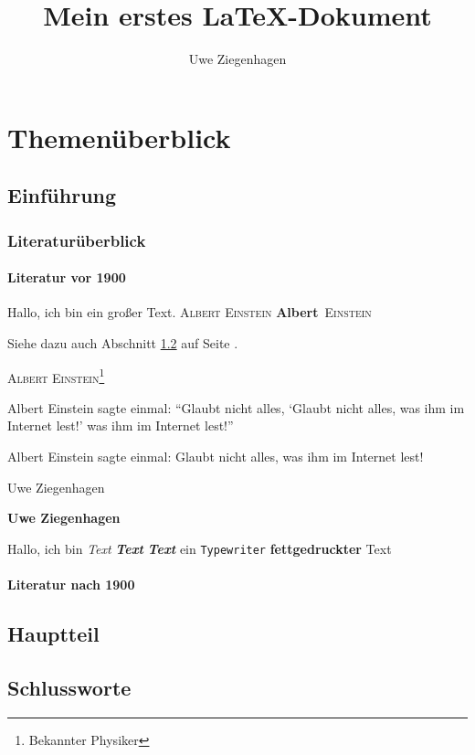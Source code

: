\documentclass[12pt,ngerman,parskip=half]{scrreprt}
\author{Uwe Ziegenhagen}
\title{Mein erstes \LaTeX-Dokument}
\newcommand{\person}[1]{\textsc{#1}}
\newcommand{\pperson}[2]{\textbf{#1}~\textsc{#2}}
\begin{document}
\maketitle

\tableofcontents

\chapter{Themenüberblick}

\section{Einführung}
\subsection{Literaturüberblick}
\subsubsection{Literatur vor 1900}

Hallo, ich {\tiny bin} ein {\Huge großer} Text. \person{Albert Einstein} \pperson{Albert}{Einstein} 

Siehe dazu auch Abschnitt \ref{sec:hauptteil} auf Seite \pageref{sec:hauptteil}.

\person{Albert Einstein}\footnote{Bekannter Physiker}

Albert Einstein sagte einmal: \enquote{Glaubt nicht alles, \enquote{Glaubt nicht alles, was ihm im Internet lest!} was ihm im Internet lest!}

Albert Einstein sagte einmal: \glqq Glaubt nicht alles, was ihm im Internet lest!\grqq


\textmd{Uwe Ziegenhagen}

\textbf{Uwe Ziegenhagen}


Hallo, ich bin \textit{Text} \textit{\textbf{Text}} \textbf{\textit{Text}}   ein \texttt{Typewriter} \textbf{fettgedruckter} Text

\blindtext

\blindtext

\blindtext

\subsubsection{Literatur nach 1900}

\blindtext

\blindtext

\blindtext

\section{Hauptteil}\label{sec:hauptteil}

\blindtext[100]


\section{Schlussworte}

\blindtext[10]
\end{document}

